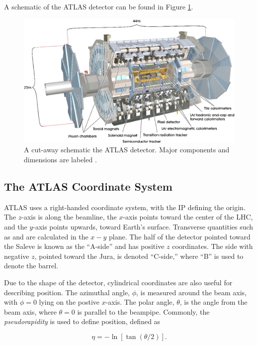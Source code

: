 A schematic of the ATLAS detector can be found in Figure \ref{fig:atlas}.

\begin{figure}[!ht]
    \centering
    \includegraphics[width=.7\textwidth]{chapters/chapter2_experiment/images/atlas_detector.png}
    \caption[A cut-away schematic the ATLAS detector]{A cut-away schematic the ATLAS detector. Major components and dimensions are labeled \cite{atlas-experiment}.}
    \label{fig:atlas}
\end{figure}

\subsection{The ATLAS Coordinate System}

ATLAS uses a right-handed coordinate system, with the \gls{IP} defining the origin. The $z$-axis is along the beamline, the $x$-axis points toward the center of the \gls{LHC}, and the $y$-axis points upwards, toward Earth's surface.  Transverse quantities such as \pt and \et are calculated in the $x-y$ plane. The half of the detector pointed toward the Saleve is known as the ``A-side'' and has positive $z$ coordinates. The side with negative $z$, pointed toward the Jura, is denoted ``C-side,'' where ``B'' is used to denote the barrel.

Due to the shape of the detector, cylindrical coordinates are also useful for describing position. The azimuthal angle, $\phi$, is measured around the beam axis, with $\phi=0$ lying on the postive $x$-axis. The polar angle, $\theta$, is the angle from the beam axis, where $\theta=0$ is parallel to the beampipe. Commonly, the \textit{pseudorapidity} is used to define position, defined as

\begin{equation}
    \eta = -\ln[\tan(\theta / 2)].
\end{equation}

